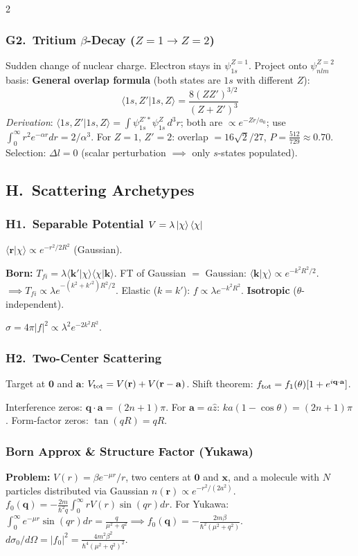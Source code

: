 \documentclass[9pt,a4paper]{article} %
\begin{document}
\begin{multicols}{2}
\subsubsection{G2.\ Tritium $\beta$-Decay ($Z{=}1\to Z{=}2$)}
Sudden change of nuclear charge. Electron stays in $\psi_{1s}^{Z=1}$.
Project onto $\psi_{nlm}^{Z=2}$ basis:
\textbf{General overlap formula} (both states are $1s$ with different $Z$):
\[
  \langle 1s,Z'|1s,Z\rangle = \frac{8(ZZ')^{3/2}}{(Z+Z')^3}
\]
\textit{Derivation}: $\langle 1s,Z'|1s,Z\rangle = \int \psi_{1s}^{Z'*}\psi_{1s}^Z\,d^3r$; both are $\propto e^{-Zr/a_0}$; use $\int_0^\infty r^2 e^{-\alpha r}dr = 2/\alpha^3$.
For $Z=1$, $Z'=2$: overlap $= 16\sqrt{2}/27$,
$P=\frac{512}{729}\approx 0.70$.
Selection: $\Delta l=0$ (scalar perturbation $\implies$ only $s$-states populated).

\subsection{H.\ Scattering Archetypes}

\subsubsection{H1.\ Separable Potential $V=\lambda\ket{\chi}\bra{\chi}$}
$\langle\mathbf{r}|\chi\rangle\propto e^{-r^2/2R^2}$ (Gaussian).

\textbf{Born:} $T_{fi}=\lambda\langle\mathbf{k}'|\chi\rangle\langle\chi|\mathbf{k}\rangle$.
FT of Gaussian $=$ Gaussian: $\langle\mathbf{k}|\chi\rangle\propto e^{-k^2 R^2/2}$.
$\implies T_{fi}\propto\lambda e^{-(k^2+k'^2)R^2/2}$.
Elastic ($k=k'$): $f\propto\lambda e^{-k^2 R^2}$. \textbf{Isotropic} ($\theta$-independent).

$\sigma=4\pi|f|^2\propto\lambda^2 e^{-2k^2 R^2}$.

\subsubsection{H2.\ Two-Center Scattering}
Target at $\mathbf{0}$ and $\mathbf{a}$: $V_{\rm tot}=V(\mathbf{r})+V(\mathbf{r}-\mathbf{a})$.
Shift theorem: $f_{\rm tot}=f_1(\theta)[1+e^{i\mathbf{q}\cdot\mathbf{a}}]$.

Interference zeros: $\mathbf{q}\cdot\mathbf{a}=(2n+1)\pi$.
For $\mathbf{a}=a\hat{z}$: $ka(1-\cos\theta)=(2n+1)\pi$.
Form-factor zeros: $\tan(qR)=qR$.
\subsubsection{ Born Approx \& Structure Factor (Yukawa)}
\textbf{Problem:} $V(r)=\beta e^{-\mu r}/r$, two centers at $\mathbf{0}$ and $\mathbf{x}$, and a molecule with $N$ particles distributed via Gaussian $n(\mathbf{r}) \propto e^{-r^2/(2a^2)}$.\\
$f_0(\mathbf{q}) = -\frac{2m}{\hbar^2 q}\int_0^\infty r V(r)\sin(qr)dr$.
For Yukawa: $\int_0^\infty e^{-\mu r}\sin(qr)dr = \frac{q}{\mu^2+q^2} \implies f_0(\mathbf{q}) = -\frac{2m\beta}{\hbar^2(\mu^2+q^2)}$.
$d\sigma_0/d\Omega = |f_0|^2 = \frac{4m^2\beta^2}{\hbar^4(\mu^2+q^2)^2}$.


\end{multicols}
\end{document}
